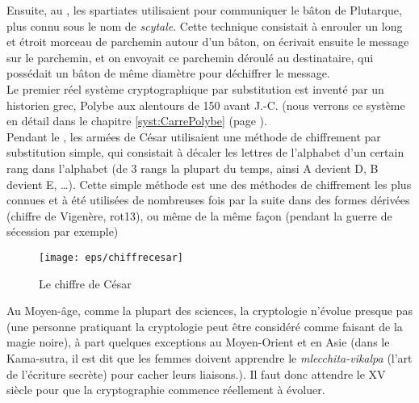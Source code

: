 Ensuite, au , les spartiates utilisaient pour communiquer le
bâton de Plutarque, plus connu sous le nom de \emph{scytale}. Cette
technique consistait à enrouler un long et étroit morceau de parchemin
autour d'un bâton, on écrivait ensuite le message sur le parchemin, et
on envoyait ce parchemin déroulé au destinataire, qui possédait un
bâton
de même diamètre pour déchiffrer le message. \\

Le premier réel système cryptographique par substitution est inventé
par un historien grec, Polybe aux alentours de 150 avant J.-C. (nous
verrons ce système en détail dans le chapitre \ref{syst:CarrePolybe} (page
\pageref{syst:CarreColybe}). \\

\label{syst:ChiffreCesar}
Pendant le , les armées de César utilisaient une méthode de
chiffrement par substitution simple, qui consistait à décaler les
lettres de l'alphabet d'un certain rang dans l'alphabet (de 3 rangs la
plupart du temps, ainsi A devient D, B devient E, \dots). Cette simple
méthode est une des méthodes de chiffrement les plus connues et à été
utilisées de nombreuses fois par la suite dans des formes dérivées (chiffre de
Vigenère, rot13), ou même
de la même façon (pendant la guerre de sécession par exemple)

\begin{figure}[h]
  \begin{center}
    \texttt{[image: eps/chiffrecesar]}
  \end{center}
  \caption{Le chiffre de César}
  \label{fig:chiffrecesar}
\end{figure}

Au Moyen-âge, comme la plupart des sciences, la cryptologie n'évolue
presque pas (une personne pratiquant la cryptologie peut être
considéré comme faisant de la magie noire), à part quelques exceptions
au Moyen-Orient et en Asie (dans le Kama-sutra, il est dit que les
femmes doivent apprendre le \emph{mlecchita-vikalpa} (l'art de
l'écriture secrète) pour cacher leurs liaisons.). Il faut donc
attendre le XV\ieme~ siècle pour que la cryptographie commence
réellement à évoluer. \\

